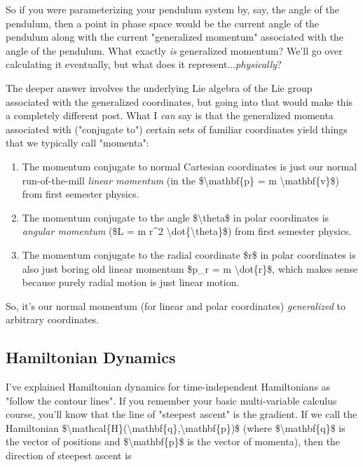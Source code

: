 \documentclass[]{article}
\begin{document}
So if you were parameterizing your pendulum system by, say, the angle of the
pendulum, then a point in phase space would be the current angle of the pendulum
along with the current "generalized momentum" associated with the angle of the
pendulum. What exactly \emph{is} generalized momentum? We'll go over calculating
it eventually, but what does it represent...\emph{physically}?

The deeper answer involves the underlying Lie algebra of the Lie group
associated with the generalized coordinates, but going into that would make this
a completely different post. What I \emph{can} say is that the generalized
momenta associated with ("conjugate to") certain sets of familiar coordinates
yield things that we typically call "momenta":

\begin{enumerate}
\item
  The momentum conjugate to normal Cartesian coordinates is just our normal
  run-of-the-mill \emph{linear momentum} (in the \$\textbackslash{}mathbf\{p\} =
  m \textbackslash{}mathbf\{v\}\$) from first semester physics.
\item
  The momentum conjugate to the angle \$\textbackslash{}theta\$ in polar
  coordinates is \emph{angular momentum} (\$L = m r\^{}2
  \textbackslash{}dot\{\textbackslash{}theta\}\$) from first semester physics.
\item
  The momentum conjugate to the radial coordinate \$r\$ in polar coordinates is
  also just boring old linear momentum \$p\_r = m \textbackslash{}dot\{r\}\$,
  which makes sense because purely radial motion is just linear motion.
\end{enumerate}

So, it's our normal momentum (for linear and polar coordinates)
\emph{generalized} to arbitrary coordinates.

\subsection{Hamiltonian Dynamics}

I've explained Hamiltonian dynamics for time-independent Hamiltonians as "follow
the contour lines". If you remember your basic multi-variable calculus course,
you'll know that the line of "steepest ascent" is the gradient. If we call the
Hamiltonian
\$\textbackslash{}mathcal\{H\}(\textbackslash{}mathbf\{q\},\textbackslash{}mathbf\{p\})\$
(where \$\textbackslash{}mathbf\{q\}\$ is the vector of positions and
\$\textbackslash{}mathbf\{p\}\$ is the vector of momenta), then the direction of
steepest ascent is
\end{document}
